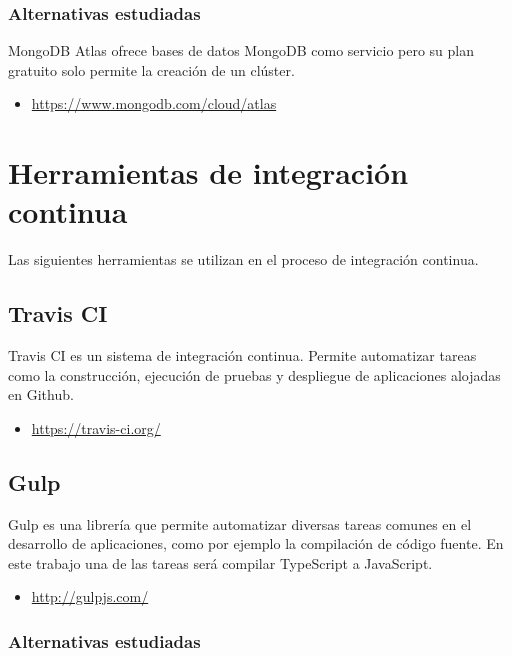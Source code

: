 \subsubsection{Alternativas estudiadas}

MongoDB Atlas ofrece bases de datos MongoDB como servicio pero su plan gratuito solo permite la creación de un clúster.

\begin{itemize}
	\item \url{https://www.mongodb.com/cloud/atlas}
\end{itemize}

\section{Herramientas de integración continua}

Las siguientes herramientas se utilizan en el proceso de integración continua.

\subsection{Travis CI}

Travis CI es un sistema de integración continua. Permite automatizar tareas como la construcción, ejecución de pruebas y despliegue de aplicaciones alojadas en Github.

\begin{itemize}
	\item \url{https://travis-ci.org/}
\end{itemize}

\subsection{Gulp}

Gulp es una librería que permite automatizar diversas tareas comunes en el desarrollo de aplicaciones, como por ejemplo la compilación de código fuente. En este trabajo una de las tareas será compilar TypeScript a JavaScript.

\begin{itemize}
	\item \url{http://gulpjs.com/}
\end{itemize}

\subsubsection{Alternativas estudiadas}

